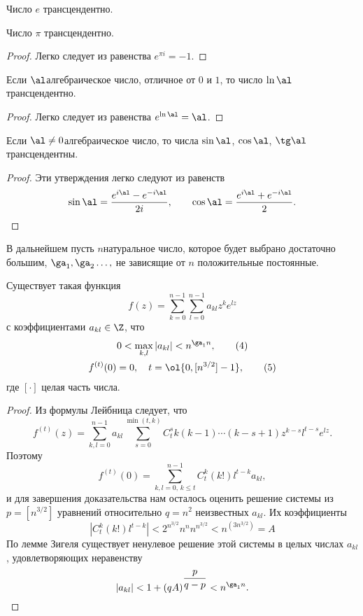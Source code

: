 \documentclass{article}
\begin{document}
\begin{imp}
Число $e$ трансцендентно.
\end{imp}

\begin{imp}
Число $\pi$ трансцендентно.
\end{imp}
\begin{proof}
Легко следует из равенства $e^{\pi i}=-1$.
\end{proof}

\begin{imp}
Если $\al$\т алгебраическое число, отличное от $0$    и
$1$, то число $\ln {\al}$ трансцендентно.
\end{imp}
\begin{proof}
Легко следует из равенства $e^{\ln \al}= \al$.
\end{proof}

\begin{imp}
Если $\al \ne 0$\т алгебраическое число, то числа
$\sin \al$, $\cos \al$, $\tg \al$ трансцендентны.
\end{imp}
\begin{proof}
Эти утверждения легко следуют из равенств
$$
\sin \al = \frac {e^{i \al}- e^{-i \al}}{2i}, \qquad
\cos \al = \frac {e^{i \al}+ e^{-i \al}}{2}.
$$
\hfill\end{proof}

В дальнейшем пусть $n$\т натуральное число, которое будет выбрано достаточно
большим, $\ga_1, \ga_2 \dots, $\т
не зависящие от $n$ положительные постоянные.

\begin{lemma}
Существует такая функция
\begin{equation}[3]
f(z)=\sum_{k=0}^{n-1} \sum_{l=0}^{n-1} a_{kl}z^k e^{lz}
\end{equation}
с коэффициентами $a_{kl} \in \Z$, что
\begin{gather}
0 < \max_{k,l} |a_{kl}| < n^{\ga_1n},
\tag 4 \\
f^{(t)}(0)=0, \quad t= \ol {0,[n^{3/2}]-1},
\tag 5
\end{gather}
где $[\cdot]$ \т целая часть числа.
\end{lemma}
\begin{proof}
Из формулы Лейбница следует, что
\begin{equation}[6]
f^{(t)}(z)= \sum_{k,l=0}^{n-1}a_{kl} \sum_{s=0}^{\min (t,k)}C_t^s
k(k-1) \cdots (k-s+1) z^{k-s} l^{t-s} e^{lz}.
\end{equation}
Поэтому
$$
f^{(t)}(0)=\sum_{k,l=0,\, k\le t}^{n-1}C_t^k(k!)l^{t-k}a_{kl},
$$
и для завершения доказательства нам осталось оценить
решение системы из $p=[n^{3/2}]$ уравнений  относительно
$q=n^2$   неизвестных  $a_{kl}$. Их коэффициенты
$$
|C_t^k(k!)l^{t-k}|<2^{n^{3/2}}n^nn^{n^{3/2}}<n^{(3n^{3/2})}=A
$$
По лемме Зигеля существует ненулевое решение этой системы в целых числах
$a_{kl}$, удовлетворяющих неравенству
$$
|a_{kl}|<1+(qA)^{\dfrac p{q-p}}<n^{\ga_1n}.
$$
\hfill\end{proof}
\end{document}
